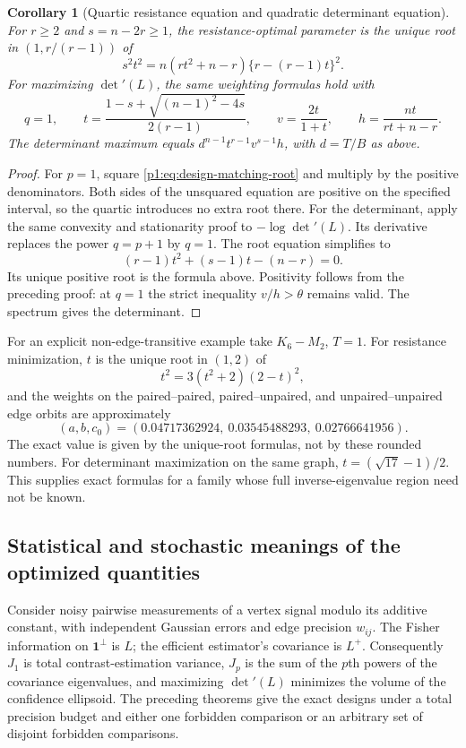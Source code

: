 \documentclass[11pt,a4paper]{article}
\newtheorem{corollary}[theorem]{Corollary}
\theoremstyle{definition}
\theoremstyle{remark}
\numberwithin{equation}{section}
\begin{document}
\begin{corollary}[Quartic resistance equation and quadratic determinant equation]
\label{p1:cor:design-matching-algebraic}
For $r\ge2$ and $s=n-2r\ge1$, the resistance-optimal parameter is the
unique root in $(1,r/(r-1))$ of
\begin{equation}\label{p1:eq:design-matching-quartic}
 s^2t^2=n(rt^2+n-r)\{r-(r-1)t\}^2.
\end{equation}
For maximizing $\det'(L)$, the same weighting formulas hold with
\[
 q=1,\qquad
 t=\frac{1-s+\sqrt{(n-1)^2-4s}}{2(r-1)},\qquad
 v=\frac{2t}{1+t},\qquad
 h=\frac{nt}{rt+n-r}.
\]
The determinant maximum equals
$d^{n-1}t^{r-1}v^{s-1}h$, with $d=T/B$ as above.
\end{corollary}
\begin{proof}
For $p=1$, square \eqref{p1:eq:design-matching-root} and multiply by the
positive denominators.  Both sides of the unsquared equation are positive
on the specified interval, so the quartic introduces no extra root there.
For the determinant, apply the same convexity and stationarity proof to
$-\log\det'(L)$.  Its derivative replaces the power $q=p+1$ by $q=1$.
The root equation simplifies to
\[
 (r-1)t^2+(s-1)t-(n-r)=0.
\]
Its unique positive root is the formula above.  Positivity follows from
the preceding proof: at $q=1$ the strict inequality $v/h>\theta$ remains
valid.  The spectrum gives the determinant.
\end{proof}

For an explicit non-edge-transitive example take $K_6-M_2$, $T=1$.
For resistance minimization, $t$ is the unique root in $(1,2)$ of
\[
 t^2=3(t^2+2)(2-t)^2,
\]
and the weights on the paired--paired, paired--unpaired, and
unpaired--unpaired edge orbits are approximately
\[
 (a,b,c_0)=(0.04717362924,\ 0.03545488293,\ 0.02766641956).
\]
The exact value is given by the unique-root formulas, not by these
rounded numbers.  For determinant maximization on the same graph,
$t=(\sqrt{17}-1)/2$.  This supplies exact formulas for a family whose
full inverse-eigenvalue region need not be known.

\subsection{Statistical and stochastic meanings of the optimized quantities}

Consider noisy pairwise measurements of a vertex signal modulo its
additive constant, with independent Gaussian errors and edge precision
$w_{ij}$.  The Fisher information on $\mathbf1^\perp$ is $L$; the
efficient estimator's covariance is $L^+$.  Consequently $J_1$ is total
contrast-estimation variance, $J_p$ is the sum of the $p$th powers of the
covariance eigenvalues, and maximizing $\det'(L)$ minimizes the volume of
the confidence ellipsoid.  The preceding theorems give the exact designs
under a total precision budget and either one forbidden comparison or an
arbitrary set of disjoint forbidden comparisons.
\end{document}
